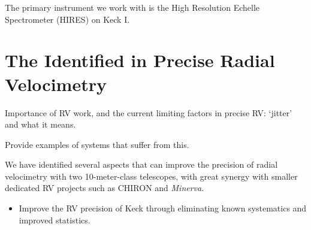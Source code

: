 \documentclass[12pt]{article}
\def\kepler{{\it Kepler}}
\def\minerva{{\it Minerva}}
\begin{document}
The primary instrument we work with is the High Resolution Echelle
Spectrometer (HIRES) on Keck I. 


\begin{comment}
We will work with the two leading RV instruments on 10-meter-class
telescopes: the High Resolution Echelle Spectrometer (HIRES) on Keck I
and the High Resolution Spectrograph (HRS) on the Hobby-Eberly
Telescope (HET).

Our work also has great synergy with two very high RV precision
instruments on smaller telescopes: CHIRON on the 1.5m SMARTS
telescope at CTIO and the upcoming project Minerva with an array of
four 0.7m telescopes.
  
The field of exoplanet is progressing in a fast pace towards the
discovery of Earth-like planets around other stars. During the past
decades, we have moved on from the age of booming discoveries of
Jupiter-mass exoplanets via radial velocimetry (add ref) to the
\kepler\ era where there are thousands of Earth- and super-Earth-size
exoplanet candidates (add ref). Moreover, great promises lie ahead with
future ground-based instruments (e.g., ESPRESSO; add ref) or space
missions (e.g., TESS; add ref).
\end{comment}


\vspace{-3pt}
\section{The Identified in Precise Radial Velocimetry}
  
Importance of RV work, and the current limiting factors in precise RV:
`jitter' and what it means.

Provide examples of systems that suffer from this.

We have identified several aspects that can improve the precision of
radial velocimetry with two 10-meter-class telescopes, with great
synergy with smaller dedicated RV projects such as CHIRON and \minerva.

\begin{itemize}[leftmargin=2.2em]
    \vspace{-3pt}
\item Improve the RV precision of Keck through eliminating known
  systematics and improved statistics.
    \vspace{-3pt}
\end{itemize}
\end{document}
